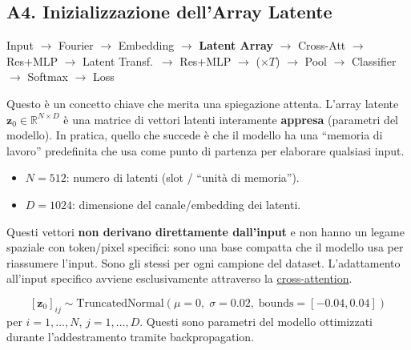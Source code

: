 \documentclass[12pt,a4paper]{article}
\begin{document}
\subsection{A4. Inizializzazione dell'Array Latente} \label{sec:latent_init}

\begin{pipelinebox}
Input $\to$ Fourier $\to$ Embedding $\to$ \textbf{Latent Array} $\to$ Cross-Att $\to$ Res+MLP $\to$ Latent Transf.\ $\to$ Res+MLP $\to$ ($\times T$) $\to$ Pool $\to$ Classifier $\to$ Softmax $\to$ Loss
\end{pipelinebox}

Questo \`e un concetto chiave che merita una spiegazione attenta. L'array latente $\mathbf{z}_0 \in \mathbb{R}^{N \times D}$ \`e una matrice di vettori latenti interamente \textbf{appresa} (parametri del modello). In pratica, quello che succede \`e che il modello ha una ``memoria di lavoro'' predefinita che usa come punto di partenza per elaborare qualsiasi input.
\begin{itemize}
    \item $N = 512$: numero di latenti (slot / ``unit\`a di memoria'').
    \item $D = 1024$: dimensione del canale/embedding dei latenti.
\end{itemize}

Questi vettori \textbf{non derivano direttamente dall'input} e non hanno un legame spaziale con token/pixel specifici: sono una base compatta che il modello usa per riassumere l'input. Sono gli stessi per ogni campione del dataset. L'adattamento all'input specifico avviene esclusivamente attraverso la \hyperref[sec:cross_attention]{cross-attention}.

\begin{formulabox}
\[
    [\mathbf{z}_0]_{ij} \sim \text{TruncatedNormal}(\mu = 0,\; \sigma = 0.02,\; \text{bounds} = [-0.04, 0.04])
\]
per $i = 1, \ldots, N$, $j = 1, \ldots, D$. Questi sono parametri del modello ottimizzati durante l'addestramento tramite backpropagation.
\end{formulabox}
\end{document}
